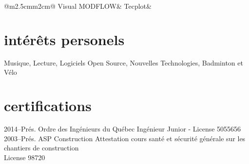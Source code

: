 \documentclass[]{friggeri-cv} %
\def\circleFull{\small\color{gray}{\FA \faCircleFull}\hspace{0.15cm}}
\def\circleEmpty{\small\color{gray}{\FA \faCircleEmpty}\hspace{0.15cm}}
\begin{document}
\begin{aside2}
\begin{tabular}{@{}m{2.5cm}m{2cm}@{}}
          \footnotesize{Visual MODFLOW}&\hfill\circleFull\circleEmpty\circleEmpty\circleEmpty\circleEmpty
          Tecplot&\hfill\circleFull\circleEmpty\circleEmpty\circleEmpty\circleEmpty        
        \end{tabular}
  \vspace{-5pt}\section{intérêts personels}\vspace{10pt}
    Musique, Lecture,
    Logiciels Open Source,
    Nouvelles Technologies,
    Badminton et Vélo
\end{aside2}
%
%
\section{certifications}
  \begin{entrylist}
    \entryFULL
      {2014--Prés.}
      {Ordre des Ingénieurs du Québec}
      {}
      {Ingénieur Junior - License 5055656}
      {}
    \entryFULL
      {2003--Prés.}
      {ASP Construction}
      {}
      {Attestation cours santé et sécurité générale sur les chantiers de construction\\License 98720}
      {}
\end{entrylist}

%
%
\end{document}
